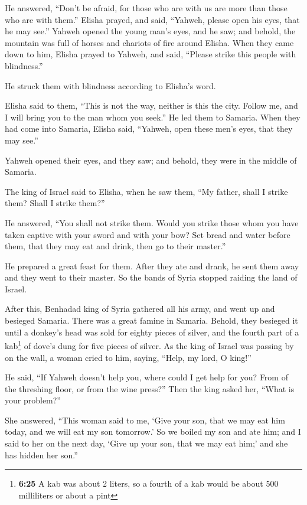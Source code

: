  He answered, ``Don't be afraid, for those who are with
us are more than those who are with them.''  Elisha
prayed, and said, ``Yahweh, please open his eyes, that he may see.''
Yahweh opened the young man's eyes, and he saw; and behold, the mountain
was full of horses and chariots of fire around Elisha. 
When they came down to him, Elisha prayed to Yahweh, and said, ``Please
strike this people with blindness.''

He struck them with blindness according to Elisha's word.

 Elisha said to them, ``This is not the way, neither is
this the city. Follow me, and I will bring you to the man whom you
seek.'' He led them to Samaria.  When they had come into
Samaria, Elisha said, ``Yahweh, open these men's eyes, that they may
see.''

Yahweh opened their eyes, and they saw; and behold, they were in the
middle of Samaria.

 The king of Israel said to Elisha, when he saw them,
``My father, shall I strike them? Shall I strike them?''

 He answered, ``You shall not strike them. Would you
strike those whom you have taken captive with your sword and with your
bow? Set bread and water before them, that they may eat and drink, then
go to their master.''

 He prepared a great feast for them. After they ate and
drank, he sent them away and they went to their master. So the bands of
Syria stopped raiding the land of Israel.

 After this, Benhadad king of Syria gathered all his
army, and went up and besieged Samaria.  There was a
great famine in Samaria. Behold, they besieged it until a donkey's head
was sold for eighty pieces of silver, and the fourth part of a
kab\footnote{\textbf{6:25} A kab was about 2 liters, so a fourth of a
  kab would be about 500 milliliters or about a pint} of dove's dung for
five pieces of silver.  As the king of Israel was passing
by on the wall, a woman cried to him, saying, ``Help, my lord, O king!''

 He said, ``If Yahweh doesn't help you, where could I get
help for you? From of the threshing floor, or from the wine press?''
 Then the king asked her, ``What is your problem?''

She answered, ``This woman said to me, `Give your son, that we may eat
him today, and we will eat my son tomorrow.'  So we
boiled my son and ate him; and I said to her on the next day, `Give up
your son, that we may eat him;' and she has hidden her son.''

